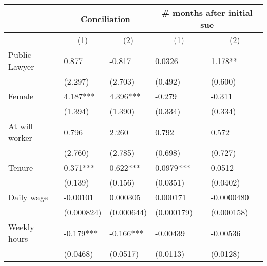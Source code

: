 \begin{tabular}{rrrrr}
\toprule
      & \multicolumn{2}{c}{Conciliation} & \multicolumn{2}{c}{\# months after initial sue} \\
\midrule
      & \multicolumn{1}{c}{(1)} & \multicolumn{1}{c}{(2)} & \multicolumn{1}{c}{(1)} & \multicolumn{1}{c}{(2)} \\
      \midrule
\multicolumn{1}{l}{Public Lawyer} & \multicolumn{1}{l}{0.877} & \multicolumn{1}{l}{-0.817} & \multicolumn{1}{l}{0.0326} & \multicolumn{1}{l}{1.178**} \\
\multicolumn{1}{l}{} & \multicolumn{1}{l}{(2.297)} & \multicolumn{1}{l}{(2.703)} & \multicolumn{1}{l}{(0.492)} & \multicolumn{1}{l}{(0.600)} \\
\multicolumn{1}{l}{Female} & \multicolumn{1}{l}{4.187***} & \multicolumn{1}{l}{4.396***} & \multicolumn{1}{l}{-0.279} & \multicolumn{1}{l}{-0.311} \\
\multicolumn{1}{l}{} & \multicolumn{1}{l}{(1.394)} & \multicolumn{1}{l}{(1.390)} & \multicolumn{1}{l}{(0.334)} & \multicolumn{1}{l}{(0.334)} \\
\multicolumn{1}{l}{At will worker} & \multicolumn{1}{l}{0.796} & \multicolumn{1}{l}{2.260} & \multicolumn{1}{l}{0.792} & \multicolumn{1}{l}{0.572} \\
\multicolumn{1}{l}{} & \multicolumn{1}{l}{(2.760)} & \multicolumn{1}{l}{(2.785)} & \multicolumn{1}{l}{(0.698)} & \multicolumn{1}{l}{(0.727)} \\
\multicolumn{1}{l}{Tenure} & \multicolumn{1}{l}{0.371***} & \multicolumn{1}{l}{0.622***} & \multicolumn{1}{l}{0.0979***} & \multicolumn{1}{l}{0.0512} \\
\multicolumn{1}{l}{} & \multicolumn{1}{l}{(0.139)} & \multicolumn{1}{l}{(0.156)} & \multicolumn{1}{l}{(0.0351)} & \multicolumn{1}{l}{(0.0402)} \\
\multicolumn{1}{l}{Daily wage} & \multicolumn{1}{l}{-0.00101} & \multicolumn{1}{l}{0.000305} & \multicolumn{1}{l}{0.000171} & \multicolumn{1}{l}{-0.0000480} \\
\multicolumn{1}{l}{} & \multicolumn{1}{l}{(0.000824)} & \multicolumn{1}{l}{(0.000644)} & \multicolumn{1}{l}{(0.000179)} & \multicolumn{1}{l}{(0.000158)} \\
\multicolumn{1}{l}{Weekly hours} & \multicolumn{1}{l}{-0.179***} & \multicolumn{1}{l}{-0.166***} & \multicolumn{1}{l}{-0.00439} & \multicolumn{1}{l}{-0.00536} \\
\multicolumn{1}{l}{} & \multicolumn{1}{l}{(0.0468)} & \multicolumn{1}{l}{(0.0517)} & \multicolumn{1}{l}{(0.0113)} & \multicolumn{1}{l}{(0.0128)} \\

\end{tabular}

